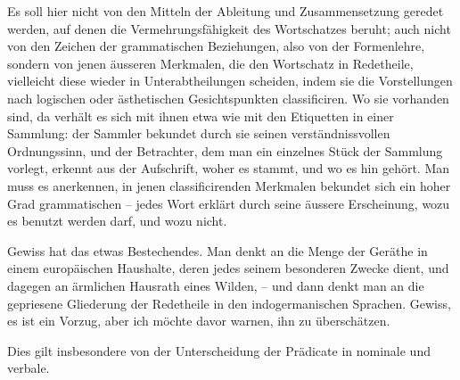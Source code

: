 Es soll hier nicht von den Mitteln der Ableitung und Zusammensetzung geredet werden, auf denen die Vermehrungsfähigkeit des Wortschatzes beruht; auch nicht von den Zeichen der grammatischen Beziehungen, also von der Formenlehre, sondern von jenen äusseren Merkmalen, die den Wortschatz in Redetheile, vielleicht diese wieder in Unterabtheilungen scheiden, indem sie die Vorstellungen nach logischen oder ästhetischen Gesichtspunkten classificiren. Wo sie vorhanden sind, da verhält es sich mit ihnen etwa wie mit den Eti\label{sp.439}quetten in einer Sammlung: der Sammler bekundet durch sie seinen verständnissvollen Ordnungssinn, und der Betrachter, dem man ein einzelnes Stück der Sammlung vorlegt, erkennt aus der Aufschrift, woher es stammt, und wo es hin gehört. Man muss es anerkennen, in jenen classificirenden Merkmalen bekundet sich ein hoher Grad grammatischen  – jedes Wort erklärt durch seine äussere Erscheinung, wozu es benutzt werden darf, und wozu nicht.
 
Gewiss hat das etwas Bestechendes. Man denkt an die Menge der Geräthe in einem  europäischen Haushalte, deren jedes seinem besonderen Zwecke dient, und dagegen an  ärmlichen Hausrath eines Wilden, – und dann denkt man an die gepriesene Gliederung der Redetheile in den indogermanischen Sprachen. Gewiss, es ist ein Vorzug, aber ich möchte davor warnen, ihn zu überschätzen.

Dies gilt insbesondere von der Unterscheidung der Prädicate in nominale und verbale. 

